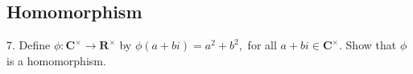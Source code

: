 \subsection{Homomorphism}
\begin{mdframed}[style=darkQuesion]
  7. Define $\phi: \mathbf{C}^{\times} \rightarrow \mathbf{R}^{\times}$ by $\phi(a+b i)=a^{2}+b^{2},$ for all $a+b i \in \mathbf{C}^{\times} .$ Show that $\phi$
is a homomorphism.
\end{mdframed}
\begin{mdframed}[style=darkAnswer,frametitle={Joe Starr}]
\end{mdframed}
\newpage
\begin{mdframed}[style=darkQuesion]
  
\end{mdframed}
